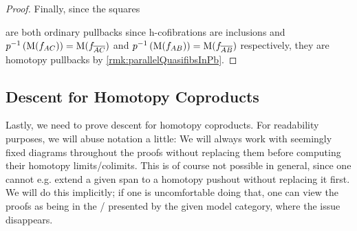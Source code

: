 \begin{prop}
\begin{proof}
        Finally, since the squares 
        \begin{center}
        \end{center}
        are both ordinary pullbacks since h-cofibrations are inclusions and $p^{-1}\left(\operatorname{M}(f_{AC})\right)=\operatorname{M}(f_{\overline{A}\overline{C}})$ and $p^{-1}\left(\operatorname{M}(f_{AB})\right)=\operatorname{M}(f_{\overline{A}\overline{B}})$ respectively, they are homotopy pullbacks by \cref{rmk:parallelQuasifibsInPb}.
    \end{proof}
\end{prop}
\subsection*{Descent for Homotopy Coproducts}
Lastly, we need to prove descent for homotopy coproducts.
For readability purposes, we will abuse notation a little:
We will always work with seemingly fixed diagrams throughout the proofs without replacing them before computing their homotopy limits/colimits.
This is of course not possible in general, since one cannot e.g. extend a given span to a homotopy pushout without replacing it first.
We will do this implicitly; if one is uncomfortable doing that, one can view the proofs as being in the \inftycat/ presented by the given model category, where the issue disappears.

